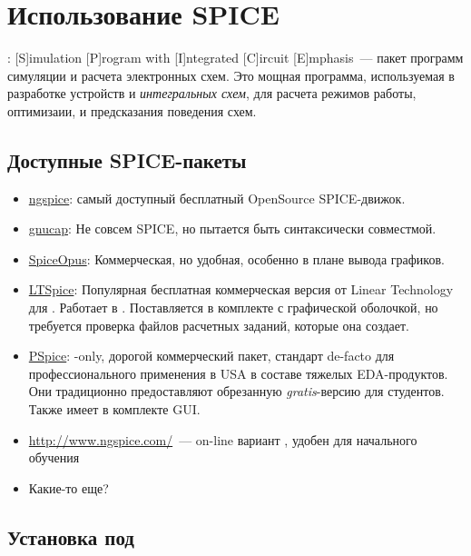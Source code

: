 
\chapter{Использование SPICE}

: [S]imulation [P]rogram with [I]ntegrated [C]ircuit
[E]mphasis\ --- пакет программ симуляции и расчета электронных схем.
Это мощная программа, используемая в разработке устройств и \emph{интегральных
схем}, для расчета режимов работы, оптимизаии, и предсказания поведения схем.

\section{Доступные SPICE-пакеты}

\begin{itemize}
\item \href{http://ngspice.sourceforge.net/}{ngspice}: самый доступный
бесплатный OpenSource SPICE-движок.
\item
\href{https://www.gnu.org/software/gnucap/}{gnucap}:
Не совсем SPICE, но пытается быть синтаксически совместмой.
\item \href{http://www.spiceopus.si/}{SpiceOpus}: Коммерческая, но
удобная, особенно в плане вывода графиков.
\item \href{http://www.linear.com/designtools/software/}{LTSpice}:
Популярная бесплатная коммерческая версия от Linear Technology для \win.
Работает в . Поставляется в комплекте с графической оболочкой,
но требуется проверка файлов расчетных заданий, которые она создает. 
\item
\href{http://www.cadence.com/products/orcad/pspice_simulation/Pages/default.aspx}{PSpice}:
\win-only, дорогой коммерческий пакет, стандарт de-facto для
профессионального применения в USA в составе тяжелых EDA-продуктов.
Они традиционно предоставляют обрезанную \emph{gratis}-версию для студентов.
Также имеет в комплекте GUI.
\item \url{http://www.ngspice.com/}\ --- on-line вариант , удобен
для начального обучения
\item Какие-то еще?
\end{itemize}

\section{Установка  под \win}

